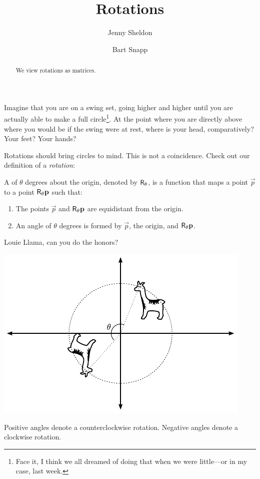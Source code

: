 \documentclass{ximera}
\author{Jenny Sheldon \and Bart Snapp}
\title{Rotations}
\begin{document}
\begin{abstract}
  We view rotations as matrices.
\end{abstract}
\maketitle

Imagine that you are on a swing set, going higher and higher until you
are actually able to make a full circle\footnote{Face it, I think we
  all dreamed of doing that when we were little---or in my case, last
  week.}. At the point where you are directly above where you would be
if the swing were at rest, where is your head, comparatively?  Your
feet?  Your hands?


Rotations should bring circles to mind. This is not a
coincidence. Check out our definition of a \textit{rotation}:

\begin{definition}
A  of $\theta$ degrees about the origin, denoted by
$\mathsf{R}_\theta$, is a function that maps a point $\vec{p}$ to a point
$\mathsf{R}_\theta \mathbf{p}$ such that:
\begin{enumerate}
\item The points $\vec{p}$ and $\mathsf{R}_\theta \mathbf{p}$ are equidistant
  from the origin.
\item An angle of $\theta$ degrees is formed by $\vec{p}$, the origin, and
  $\mathsf{R}_\theta\mathbf{p}$.
\end{enumerate}
\end{definition}

Louie Llama, can you do the honors?
\begin{image}
\includegraphics{rotIdeaEg.pdf}
\end{image}
\begin{warning} 
Positive angles denote a counterclockwise rotation. Negative angles
denote a clockwise rotation.
\end{warning}
\end{document}
